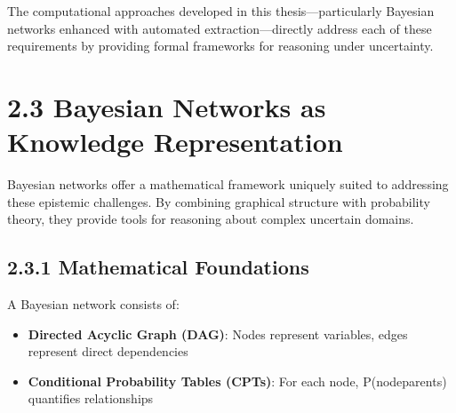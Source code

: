 \documentclass[
  11pt,
  letterpaper,
]{book}
\providecommand{\tightlist}{%
  \setlength{\itemsep}{0pt}\setlength{\parskip}{0pt}}
\begin{document}
\begin{tcolorbox}[enhanced jigsaw, opacitybacktitle=0.6, colbacktitle=quarto-callout-tip-color!10!white, toptitle=1mm, colback=white, breakable, left=2mm, bottomrule=.15mm, title=\textcolor{quarto-callout-tip-color}{\faLightbulb}\hspace{0.5em}{Key Insight}, rightrule=.15mm, arc=.35mm, toprule=.15mm, opacityback=0, colframe=quarto-callout-tip-color-frame, bottomtitle=1mm, titlerule=0mm, leftrule=.75mm, coltitle=black]

The computational approaches developed in this thesis---particularly
Bayesian networks enhanced with automated extraction---directly address
each of these requirements by providing formal frameworks for reasoning
under uncertainty.

\end{tcolorbox}

\textcite{mccaslin2024}

\textcite{gruetzemacher2022}

\section*{2.3 Bayesian Networks as Knowledge
Representation}\label{sec-bayesian-networks}


Bayesian networks offer a mathematical framework uniquely suited to
addressing these epistemic challenges. By combining graphical structure
with probability theory, they provide tools for reasoning about complex
uncertain domains.

\subsection*{2.3.1 Mathematical
Foundations}\label{sec-mathematical-foundations}

A Bayesian network consists of:

\begin{itemize}
\tightlist
\item
  \textbf{Directed Acyclic Graph (DAG)}: Nodes represent variables,
  edges represent direct dependencies
\item
  \textbf{Conditional Probability Tables (CPTs)}: For each node,
  P(node\textbar parents) quantifies relationships
\end{itemize}
\end{document}
